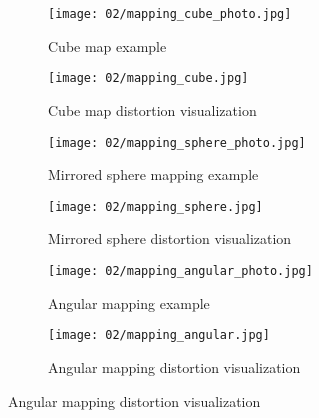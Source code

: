 \begin{figure}
\centering
    \hfill
    \begin{subfigure}[t]{0.5\textwidth}            
            \centering
            \texttt{[image: 02/mapping\_cube\_photo.jpg]}
            \caption{Cube map example}\label{fig:cubemap-intro}
    \end{subfigure}%
    \hfill
    \begin{subfigure}[t]{0.5\textwidth}
            \centering
            \texttt{[image: 02/mapping\_cube.jpg]}
            \caption{Cube map distortion visualization}\label{fig:cubemap-distortion}
  
    \end{subfigure}
    \hfill
    \par\bigskip %

    \hfill
    \begin{subfigure}[t]{0.5\textwidth}
            \centering
            \texttt{[image: 02/mapping\_sphere\_photo.jpg]}
            \caption{Mirrored sphere mapping example}
            \label{fig:sphere-intro}
    \end{subfigure}%
    \hfill
    \begin{subfigure}[t]{0.5\textwidth}
            \centering
            \texttt{[image: 02/mapping\_sphere.jpg]}
            \caption{Mirrored sphere distortion visualization}
    \end{subfigure}
    \hfill
    \par\bigskip %

    \hfill
    \begin{subfigure}[t]{0.5\textwidth}            
            \centering
            \texttt{[image: 02/mapping\_angular\_photo.jpg]}
            \caption{Angular mapping example}
            \label{fig:angular-intro}
    \end{subfigure}%
    \hfill
    \begin{subfigure}[t]{0.5\textwidth}
            \centering
            \texttt{[image: 02/mapping\_angular.jpg]}
            \caption{Angular mapping distortion visualization}
    \end{subfigure}
    \hfill
    \par\bigskip %


\end{figure}
